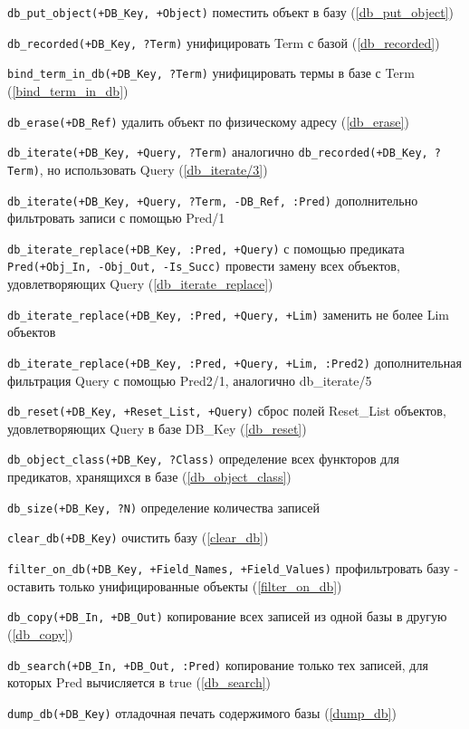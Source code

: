 \documentclass[a4paper]{book}
\begin{document}
\begin{description}
\item \verb|db_put_object(+DB_Key, +Object)| поместить объект в
  базу (\ref{db_put_object})
\item \verb|db_recorded(+DB_Key, ?Term)| унифицировать Term с
  базой (\ref{db_recorded})
\item \verb|bind_term_in_db(+DB_Key, ?Term)| унифицировать термы в
  базе с Term (\ref{bind_term_in_db})

\item \verb|db_erase(+DB_Ref)| удалить объект по физическому
  адресу (\ref{db_erase})

\item \verb|db_iterate(+DB_Key, +Query, ?Term)| аналогично
  \verb|db_recorded(+DB_Key, ?Term)|, но использовать Query
  (\ref{db_iterate/3})
\item \verb|db_iterate(+DB_Key, +Query, ?Term, -DB_Ref, :Pred)|
  дополнительно фильтровать записи с помощью Pred/1
\item \verb|db_iterate_replace(+DB_Key, :Pred, +Query)| с помощью
  предиката \verb|Pred(+Obj_In, -Obj_Out, -Is_Succ)| провести
  замену всех объектов, удовлетворяющих Query
  (\ref{db_iterate_replace})
\item \verb|db_iterate_replace(+DB_Key, :Pred, +Query, +Lim)|
  заменить не более Lim объектов
\item
  \verb|db_iterate_replace(+DB_Key, :Pred, +Query, +Lim, :Pred2)|
  дополнительная фильтрация Query с помощью Pred2/1, аналогично
  db\_iterate/5
\item \verb|db_reset(+DB_Key, +Reset_List, +Query)| сброс полей
  Reset\_List объектов, удовлетворяющих Query в базе DB\_Key (\ref{db_reset})

\item \verb|db_object_class(+DB_Key, ?Class)| определение всех
  функторов для предикатов, хранящихся в базе
  (\ref{db_object_class})

\item \verb|db_size(+DB_Key, ?N)| определение количества записей
\item \verb|clear_db(+DB_Key)| очистить базу (\ref{clear_db})
\item \verb|filter_on_db(+DB_Key, +Field_Names, +Field_Values)|
  профильтровать базу - оставить только унифицированные объекты
  (\ref{filter_on_db})
\item \verb|db_copy(+DB_In, +DB_Out)| копирование всех записей из
  одной базы в другую (\ref{db_copy})
\item \verb|db_search(+DB_In, +DB_Out, :Pred)| копирование только
  тех записей, для которых Pred вычисляется в true
  (\ref{db_search})
\item \verb|dump_db(+DB_Key)| отладочная печать содержимого базы
  (\ref{dump_db})
\end{description}
\end{document}
